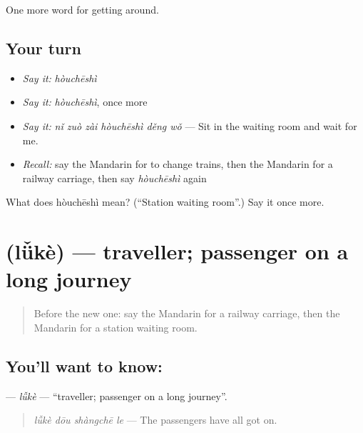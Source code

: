 \begin{grammarlens}[title={What you've built}]
One more word for getting around.
\end{grammarlens}

\subsection*{Your turn}
\begin{itemize}
\raggedright
  \item \emph{Say it:} \emph{hòuchēshì}
  \item \emph{Say it:} \emph{hòuchēshì}, once more
  \item \emph{Say it:} \emph{nǐ zuò zài hòuchēshì děng wǒ} — Sit in the waiting room and wait for me.
  \item \emph{Recall:} say the Mandarin for to change trains, then the Mandarin for a railway carriage, then say \emph{hòuchēshì} again
\end{itemize}

\begin{tcolorbox}[breakable,colback=teal!4,colframe=teal!35!black,title={Before you move on}]
What does hòuchēshì mean? (\textquotedblleft{}Station waiting room\textquotedblright{}.) Say it once more.
\end{tcolorbox}
\section[\texorpdfstring{\zh{旅客} (lǚkè)}{旅客 (lǚkè)}]{ (lǚkè) — traveller; passenger on a long journey}

\label{lesson:ZH-C403-luke}



\begin{quote}
Before the new one: say the Mandarin for a railway carriage, then the Mandarin for a station waiting room.
\end{quote}

\subsection*{You'll want to know: }
\textbf{} — \emph{lǚkè} — \textquotedblleft{}traveller; passenger on a long journey\textquotedblright{}.

\begin{quote}
\textbf{} \emph{lǚkè dōu shàngchē le} — The passengers have all got on.
\end{quote}

